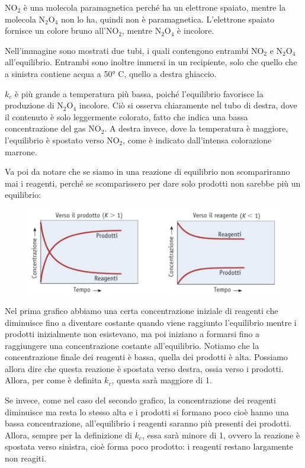 NO$_2$ è una molecola paramagnetica perché ha un elettrone spaiato, mentre la molecola N$_2$O$_4$ non lo ha, quindi non è paramagnetica. L'elettrone spaiato fornisce un colore bruno all'NO$_2$, mentre N$_2$O$_4$ è incolore.

Nell'immagine sono mostrati due tubi, i quali contengono entrambi NO$_2$ e N$_2$O$_4$ all'equilibrio. Entrambi sono inoltre immersi in un recipiente, solo che quello che a sinistra contiene acqua a 50° C, quello a destra ghiaccio.

$k_c$ è più grande a temperatura più bassa, poiché l'equilibrio favorisce la produzione di N$_2$O$_4$ incolore. Ciò si osserva chiaramente nel tubo di destra, dove il contenuto è solo leggermente colorato, fatto che indica una bassa concentrazione del gas NO$_2$. A destra invece, dove la temperatura è maggiore, l'equilibrio è spostato verso NO$_2$, come è indicato dall'intensa colorazione marrone.

\vspace{0.2cm}Va poi da notare che se siamo in una reazione di equilibrio non scompariranno mai i reagenti, perché se scomparissero per dare solo prodotti non sarebbe più un equilibrio:

\begin{figure}[htp]
    \centering
    \includegraphics[width=16cm]{immagini/reazioni_equilibrio_spostato.png}
\end{figure}

Nel prima grafico abbiamo una certa concentrazione iniziale di reagenti che diminuisce fino a diventare costante quando viene raggiunto l'equilibrio mentre i prodotti inizialmente non esistevano, ma poi iniziano a formarsi fino a raggiungere una concentrazione costante all'equilibrio. Notiamo che la concentrazione finale dei reagenti è bassa, quella dei prodotti è alta. Possiamo allora dire che questa reazione è spostata verso destra, ossia verso i prodotti. Allora, per come è definita $k_c$, questa sarà maggiore di 1.

Se invece, come nel caso del secondo grafico, la concentrazione dei reagenti diminuisce ma resta lo stesso alta e i prodotti si formano poco cioè hanno una bassa concentrazione, all'equilibrio i reagenti saranno più presenti dei prodotti. Allora, sempre per la definizione di $k_c$, essa sarà minore di 1, ovvero la reazione è spostata verso sinistra, cioè forma poco prodotto: i reagenti restano largamente non reagiti.

